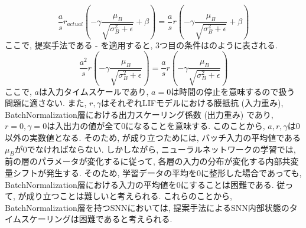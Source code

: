 \begin{equation}
    \frac{a}{s} r_{actual} \left(-\gamma \frac{\mu_B}{\sqrt{\sigma_B^2+\epsilon}} +\beta\right)  = \frac{a}{s} r \left(-\gamma \frac{\mu_B}{\sqrt{\sigma_B^2+\epsilon}} +\beta\right)  
    \label{eq:batchnormalization:lif:approximation:condition3}
\end{equation}
ここで, 提案手法である - を適用すると, 3つ目の条件はのように表される.
\begin{equation}
    \frac{a^2}{s} r \left(-\gamma \frac{\mu_B}{\sqrt{\sigma_B^2+\epsilon}}\right)  = \frac{a}{s} r \left(-\gamma \frac{\mu_B}{\sqrt{\sigma_B^2+\epsilon}}\right)  
    \label{eq:batchnormalization:lif:approximation:condition3:result}
\end{equation}
ここで, $a$は入力タイムスケールであり, $a=0$は時間の停止を意味するので扱う問題に適さない.
また, $r, \gamma$はそれぞれLIFモデルにおける膜抵抗 (入力重み), BatchNormalization層における出力スケーリング係数 (出力重み) であり, $r=0, \gamma=0$は入出力の値が全て0になることを意味する.
このことから, $a, r, \gamma$は0以外の実数値となる.
そのため, が成り立つためには, バッチ入力の平均値である$\mu_B$が0でなければならない.
しかしながら, ニューラルネットワークの学習では, 前の層のパラメータが変化するに従って, 各層の入力の分布が変化する内部共変量シフトが発生する\cite{batchnorm}.
そのため, 学習データの平均を0に整形した場合であっても, BatchNormalization層における入力の平均値を0にすることは困難である.
従って, が成り立つことは難しいと考えられる.
これらのことから, BatchNormalization層を持つSNNにおいては, 提案手法によるSNN内部状態のタイムスケーリングは困難であると考えられる.
